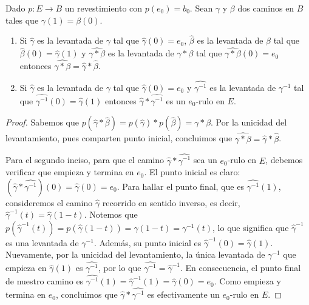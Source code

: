 \documentclass{article}
\theoremstyle{plain}
\theoremstyle{definition}
\newenvironment{ejercicio}[1]{\begin{trivlist}
\item[\hskip \labelsep {\bfseries Ejercicio}\hskip \labelsep {\bfseries #1.}]}{\end{trivlist}}
\begin{document}
\begin{ejercicio}{5}
    Dado \( p:E\rightarrow B \) un revestimiento con \( p(e_{0})=b_{0} \). Sean \( \gamma \) y \( \beta \) dos caminos en \( B \) tales que \( \gamma(1)=\beta(0) \).
    \begin{enumerate}
        \item Si \( \hat{\gamma} \) es la levantada de \( \gamma \) tal que \( \hat{\gamma}(0)=e_{0} \), \( \hat{\beta} \) es la levantada de \( \beta \) tal que \( \hat{\beta}(0)=\hat{\gamma}(1) \) y \( \widehat{\gamma*\beta} \) es la levantada de \( \gamma*\beta \) tal que \( \widehat{\gamma*\beta}(0)=e_{0} \) entonces \( \widehat{\gamma*\beta}=\hat{\gamma}*\hat{\beta} \).
        \item Si \( \hat{\gamma} \) es la levantada de \( \gamma \) tal que \( \hat{\gamma}(0)=e_{0} \) y \( \widehat{\gamma^{-1}} \) es la levantada de \( \gamma^{-1} \) tal que \( \widehat{\gamma^{-1}}(0)=\hat{\gamma}(1) \) entonces \( \hat{\gamma}*\widehat{\gamma^{-1}} \) es un \( e_{0} \)-rulo en \( E \).
    \end{enumerate}
\end{ejercicio}
\begin{proof}
    Sabemos que \( p(\hat{\gamma} \ast \hat{\beta}) = p(\hat{\gamma}) \ast p(\hat{\beta}) = \gamma \ast \beta \). Por la unicidad del levantamiento, pues comparten punto inicial, concluimos que \( \widehat{\gamma*\beta} = \hat{\gamma}*\hat{\beta} \).

    Para el segundo inciso, para que el camino \( \hat{\gamma}*\widehat{\gamma^{-1}} \) sea un \( e_0 \)-rulo en \( E \), debemos verificar que empieza y termina en \( e_0 \).
    El punto inicial es claro: \( (\hat{\gamma}*\widehat{\gamma^{-1}})(0) = \hat{\gamma}(0) = e_0 \).
    Para hallar el punto final, que es \( \widehat{\gamma^{-1}}(1) \), consideremos el camino \( \hat{\gamma} \) recorrido en sentido inverso, es decir, \( \hat{\gamma}^{-1}(t) = \hat{\gamma}(1-t) \).
    Notemos que \( p(\hat{\gamma}^{-1}(t)) = p(\hat{\gamma}(1-t)) = \gamma(1-t) = \gamma^{-1}(t) \), lo que significa que \( \hat{\gamma}^{-1} \) es una levantada de \( \gamma^{-1} \).
    Además, su punto inicial es \( \hat{\gamma}^{-1}(0) = \hat{\gamma}(1) \).
    Nuevamente, por la unicidad del levantamiento, la única levantada de \( \gamma^{-1} \) que empieza en \( \hat{\gamma}(1) \) es \( \widehat{\gamma^{-1}} \), por lo que \( \widehat{\gamma^{-1}} = \hat{\gamma}^{-1} \).
    En consecuencia, el punto final de nuestro camino es \( \widehat{\gamma^{-1}}(1) = \hat{\gamma}^{-1}(1) = \hat{\gamma}(0) = e_0 \).
    Como empieza y termina en \( e_0 \), concluimos que \( \hat{\gamma}*\widehat{\gamma^{-1}} \) es efectivamente un \( e_0 \)-rulo en \( E \).
\end{proof}
\end{document}
